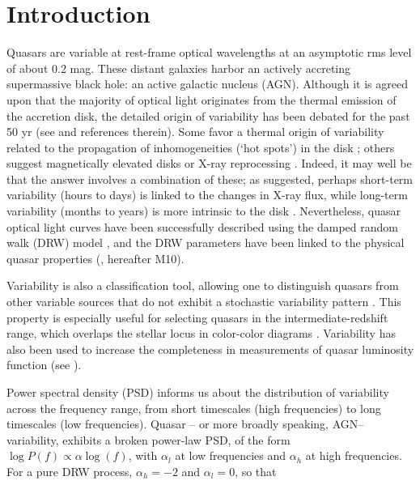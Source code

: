 \documentclass[twocolumn]{aastex62}
\begin{document}
\section{Introduction}

Quasars are variable at rest-frame optical wavelengths at an asymptotic rms level of about 0.2 mag. These distant galaxies harbor an actively accreting supermassive black hole: an active galactic nucleus (AGN). Although it is agreed upon that the majority of optical light originates from the thermal emission of the accretion disk, the detailed origin of variability has been debated for the past 50 yr (see \citealt{sun2018} and references therein). Some favor a thermal origin of variability \citep{kelly2013} related to the propagation of inhomogeneities (`hot spots') in the disk \citep{dexter2011, cai2016}; others suggest magnetically elevated disks \citep{dexter2019} or X-ray reprocessing  \citep{kubota2018}.  Indeed, it may well be that the answer involves a combination of these; as \cite{sanchez2018} suggested, perhaps short-term variability (hours to days) is linked to the changes in X-ray flux, while long-term variability (months to years) is more intrinsic to the disk \citep{edelson2015,lira2015}. Nevertheless, quasar optical light curves have been successfully described using the damped random walk (DRW) model \citep{kelly2009, macleod2010, kozlowski2010, zu2011, kasliwal2015a}, and the DRW parameters have been linked to the physical quasar properties (\citealt{macleod2010}, hereafter M10). 

Variability is also a classification tool, allowing one to distinguish quasars from other variable sources that do not exhibit a stochastic variability pattern \citep{macleod2011}. This property is especially useful for selecting quasars in the intermediate-redshift range, which overlaps the stellar locus in color-color diagrams \citep{sesar2007, yang2017}. Variability has also been used to increase the completeness in measurements of quasar luminosity function (see \citealt{mcgreer2013, mcgreer2018, palanque2013, ross2013, alsayyad2016}). 

Power spectral density (PSD) informs us about the distribution of variability across the frequency range, from short timescales (high frequencies) to long timescales (low frequencies). Quasar -- or more broadly speaking, AGN-- variability, exhibits a broken power-law PSD, of the form 
$\log{P(f)} \propto \alpha \log{(f)}$, with $\alpha_l$ at low frequencies and $\alpha_h$ at high frequencies. For a pure DRW process,  $\alpha_{h}{=}-2$ and $\alpha_{l}{=}0$, so that
\end{document}
